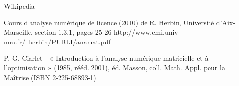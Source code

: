 \begin{thebibliography}{9}
  Wikipedia%

  Cours d'analyse numérique de licence (2010) de R. Herbin, Université d'Aix-Marseille, section 1.3.1, pages 25-26
  http://www.cmi.univ-mrs.fr/~herbin/PUBLI/anamat.pdf
  
  P. G. Ciarlet - « Introduction à l'analyse numérique matricielle et à l'optimisation » (1985, rééd. 2001), éd. Masson, coll. Math. Appl. pour la Maîtrise (ISBN 2-225-68893-1)

  

  

\end{thebibliography}
